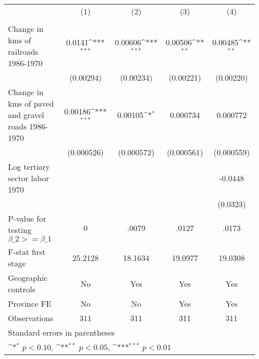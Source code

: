 {
\def\sym#1{\ifmmode^{#1}\else\(^{#1}\)\fi}
\begin{tabular}{l*{4}{c}}
\hline\hline
                &\multicolumn{1}{c}{(1)}&\multicolumn{1}{c}{(2)}&\multicolumn{1}{c}{(3)}&\multicolumn{1}{c}{(4)}\\
                &\multicolumn{1}{c}{}&\multicolumn{1}{c}{}&\multicolumn{1}{c}{}&\multicolumn{1}{c}{}\\
\hline
Change in kms of railroads 1986-1970&   0.0141\sym{***}&  0.00606\sym{***}&  0.00506\sym{**} &  0.00485\sym{**} \\
                &(0.00294)         &(0.00234)         &(0.00221)         &(0.00220)         \\
[1em]
Change in kms of paved and gravel roads 1986-1970&  0.00186\sym{***}&  0.00105\sym{*}  & 0.000734         & 0.000772         \\
                &(0.000526)         &(0.000572)         &(0.000561)         &(0.000559)         \\
[1em]
Log tertiary sector labor 1970&                  &                  &                  &  -0.0448         \\
                &                  &                  &                  & (0.0323)         \\
\hline
P-value for testing $\beta\_{2} >= \beta\_{1}$&        0         &    .0079         &    .0127         &    .0173         \\
F-stat first stage&  25.2128         &  18.1634         &  19.0977         &  19.0308         \\
Geographic controls&       No         &      Yes         &      Yes         &      Yes         \\
Province FE     &       No         &       No         &      Yes         &      Yes         \\
Observations    &      311         &      311         &      311         &      311         \\
\hline\hline
\multicolumn{5}{l}{\footnotesize Standard errors in parentheses}\\
\multicolumn{5}{l}{\footnotesize \sym{*} \(p<0.10\), \sym{**} \(p<0.05\), \sym{***} \(p<0.01\)}\\
\end{tabular}
}
